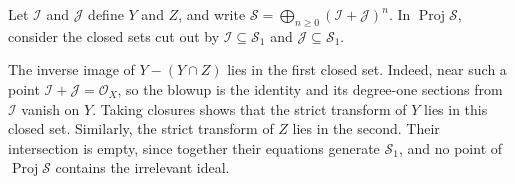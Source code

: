 Let $\mathcal I$ and $\mathcal J$ define $Y$ and $Z$, and write $\mathcal S=\bigoplus_{n\ge0}(\mathcal I+\mathcal J)^n$. In $\operatorname{Proj}\mathcal S$, consider the closed sets cut out by $\mathcal I\subseteq\mathcal S_1$ and $\mathcal J\subseteq\mathcal S_1$.

The inverse image of $Y-(Y\cap Z)$ lies in the first closed set. Indeed, near such a point $\mathcal I+\mathcal J=\mathcal O_X$, so the blowup is the identity and its degree-one sections from $\mathcal I$ vanish on $Y$. Taking closures shows that the strict transform of $Y$ lies in this closed set. Similarly, the strict transform of $Z$ lies in the second. Their intersection is empty, since together their equations generate $\mathcal S_1$, and no point of $\operatorname{Proj}\mathcal S$ contains the irrelevant ideal.
